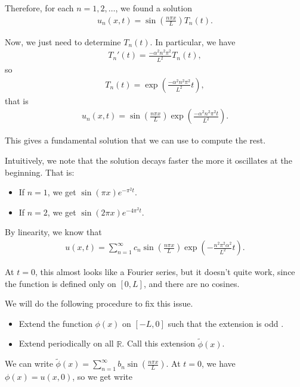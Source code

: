 \documentclass{article}
\newcommand{\RR}{\mathbb{R}}
\begin{document}
Therefore, for each $n = 1, 2, \dots$, we found a solution
\begin{align*}
  u_n(x, t) = \sin \left( \frac{n \pi x}{L} \right)  T_n(t).
\end{align*}

Now, we just need to determine $T_n(t)$.  In particular, we have
\begin{align*}
  T_n'(t) = \frac{- \alpha^2 n^2 \pi^2}{L^2} T_n(t), 
\end{align*}
so
\begin{align*}
  T_n(t) = \exp \left( \frac{- \alpha^2 n^2 \pi^2}{L^2} t \right),
\end{align*}
that is
\begin{align*}
  u_n(x, t) = \sin \left( \frac{n \pi x}{L} \right) \exp \left( \frac{- \alpha^2 n^2 \pi^2 t}{L^2} \right).
\end{align*}

This gives a fundamental solution that we can use to compute the rest.

Intuitively, we note that the solution decays faster the more it oscillates at the beginning.  That is:

\begin{itemize}
  \item If $n = 1$, we get $\sin(\pi x) e^{- \pi^2 t}$.
  \item If $n = 2$, we get $\sin (2 \pi x) e^{- 4 \pi^2 t}$.
\end{itemize}

By linearity, we know that
\begin{align*}
  u(x, t) = \sum_{n=1}^{\infty} c_n \sin \left( \frac{n \pi x}{L} \right)  \exp \left( - \frac{n^2 \pi^2 \alpha^2}{L^2} t \right).
\end{align*}

At $t = 0$, this almost looks like a Fourier series, but it doesn't quite work, since the function is defined only on $[0, L]$, and there are no cosines.

We will do the following procedure to fix this issue.

\begin{itemize}
  \item Extend the function $\phi(x)$ on $[-L, 0]$ such that the extension is odd .
  \item Extend periodically on all $\RR$.  Call this extension $\tilde{\phi}(x)$.
\end{itemize}

We can write $\tilde{\phi}(x) = \sum_{n=1}^{\infty} b_n \sin  \left( \frac{n \pi x}{L} \right)$.  At $t = 0$, we have $\phi(x) = u(x, 0)$, so we get write
\end{document}
